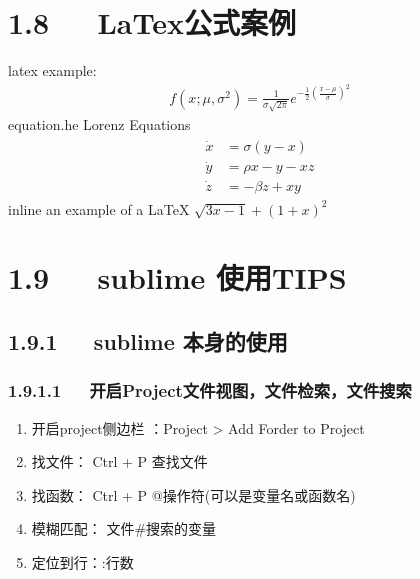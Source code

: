 \documentclass[letterpaper,12pt,english]{sphinxmanual}
\begin{document}
\section{1.8   LaTex公式案例}
\label{\detokenize{001software/001install/sublime:latex}}
latex example:
\begin{equation*}
\begin{split}f(x;\mu,\sigma^2) = \frac{1}{\sigma\sqrt{2\pi}} e^{ -\frac{1}{2}\left(\frac{x-\mu}{\sigma}\right)^2 }\end{split}
\end{equation*}
equation.he Lorenz Equations
\begin{equation*}
\begin{split}\begin{aligned}\dot{x} & = \sigma(y-x) \\\dot{y} & = \rho x - y - xz \\\dot{z} & = -\beta z + xy\end{aligned}\end{split}
\end{equation*}
inline an example of a LaTeX
\(\sqrt{3x-1}+(1+x)^2\)


\section{1.9   sublime 使用TIPS}
\label{\detokenize{001software/001install/sublime:sublime-tips}}

\subsection{1.9.1   sublime 本身的使用}
\label{\detokenize{001software/001install/sublime:id10}}

\subsubsection{1.9.1.1   开启Project文件视图，文件检索，文件搜索}
\label{\detokenize{001software/001install/sublime:project}}\begin{enumerate}
%
\item {} 
开启project侧边栏 ：Project \sphinxhyphen{}> Add Forder to Project

\item {} 
找文件： Ctrl + P 查找文件

\item {} 
找函数： Ctrl + P  @操作符(可以是变量名或函数名)

\item {} 
模糊匹配： 文件\#搜索的变量

\item {} 
定位到行：:行数

\end{enumerate}
\end{document}
